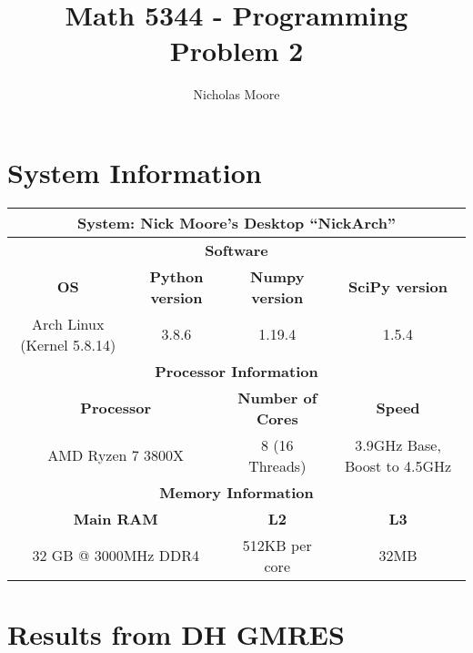 \documentclass[oneside,final]{amsart}  %
\title{Math 5344 - Programming Problem 2}
\author{Nicholas Moore}
\begin{document}
\maketitle
\section{System Information}
  \begin{table}[htpb]
    \centering
    \begin{tabular}{|c|c|c|c|}
      \hline
      \multicolumn{4}{|c|}{\textbf{System: }Nick Moore's Desktop ``NickArch'' }\\
      \hline
      \hline
      \multicolumn{4}{|c|}{\textbf{Software}} \\
      \hline
      \textbf{OS} & \textbf{Python version} & \textbf{Numpy version} & \textbf{SciPy version} \\
      \hline
      Arch Linux (Kernel 5.8.14) & 3.8.6 & 1.19.4 & 1.5.4 \\
      \hline
      \multicolumn{4}{|c|}{\textbf{Processor Information}} \\
      \hline
      \multicolumn{2}{|c|}{\textbf{Processor}} & \textbf{Number of Cores} & \textbf{Speed} \\
      \hline
      \multicolumn{2}{|c|}{AMD Ryzen 7 3800X} & 8 (16 Threads) & 3.9GHz Base, Boost to 4.5GHz \\
      \hline
      \multicolumn{4}{|c|}{\textbf{Memory Information}} \\
      \hline
      \multicolumn{2}{|c|}{\textbf{Main RAM}} & \textbf{L2} & \textbf{L3} \\
      \hline
      \multicolumn{2}{|c|}{32 GB @ 3000MHz DDR4} & 512KB  per core & 32MB \\
      \hline
    \end{tabular}
  \end{table}
  \section{Results from DH GMRES}
\end{document}
